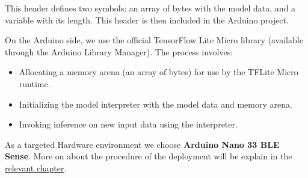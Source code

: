 This header defines two symbols: an array of bytes with the model data, and a variable with its length. This header is then included in the Arduino project.

On the Arduino side, we use the official TensorFlow Lite Micro library (available through the Arduino Library Manager). The process involves:

\begin{itemize}
    \item Allocating a memory arena (an array of bytes) for use by the TFLite Micro runtime.
    \item Initializing the model interpreter with the model data and memory arena.
    \item Invoking inference on new input data using the interpreter.
\end{itemize}


As a targeted Hardware environment we choose \textbf{Arduino Nano 33 BLE Sense}. More on about the procedure of the deployment will be explain in the  \hyperref[chap:DeploymentEnvironment]{relevant chapter}.


